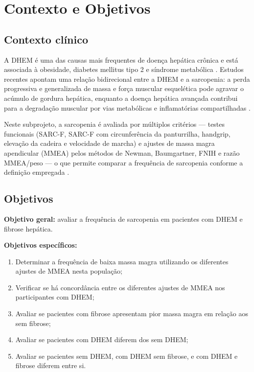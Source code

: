 \documentclass[11pt,a4paper]{article}
\begin{document}
\section{Contexto e Objetivos}

\subsection{Contexto clínico}

A DHEM é uma das causas mais frequentes de doença hepática crônica e está
associada à obesidade, diabetes mellitus tipo 2 e síndrome metabólica
\cite{buzzetti2016,eslam2020,easl2024}. Estudos
recentes apontam uma relação bidirecional entre a DHEM e a sarcopenia: a perda
progressiva e generalizada de massa e força muscular esquelética pode agravar o
acúmulo de gordura hepática, enquanto a doença hepática avançada contribui para
a degradação muscular por vias metabólicas e inflamatórias compartilhadas
\cite{sarcopenia_masld2025}.

Neste subprojeto, a sarcopenia é avaliada por múltiplos critérios — testes
funcionais (SARC-F, SARC-F com circunferência da panturrilha, handgrip, elevação
da cadeira e velocidade de marcha) e ajustes de massa magra apendicular (MMEA)
pelos métodos de Newman, Baumgartner, FNIH e razão MMEA/peso — o que permite
comparar a frequência de sarcopenia conforme a definição empregada
\cite{sbgg2022}.

\subsection{Objetivos}

\textbf{Objetivo geral:} avaliar a frequência de sarcopenia em pacientes com
DHEM e fibrose hepática.

\textbf{Objetivos específicos:}
\begin{enumerate}
  \item Determinar a frequência de baixa massa magra utilizando os diferentes
        ajustes de MMEA nesta população;
  \item Verificar se há concordância entre os diferentes ajustes de MMEA nos
        participantes com DHEM;
  \item Avaliar se pacientes com fibrose apresentam pior massa magra em relação
        aos sem fibrose;
  \item Avaliar se pacientes com DHEM diferem dos sem DHEM;
  \item Avaliar se pacientes sem DHEM, com DHEM sem fibrose, e com DHEM e
        fibrose diferem entre si.
\end{enumerate}
\end{document}
